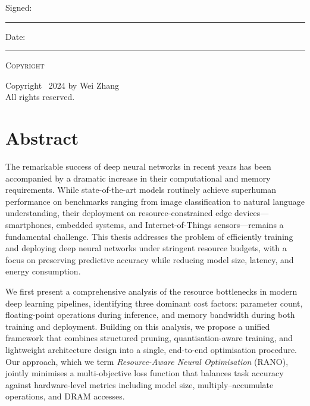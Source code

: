 \documentclass[12pt,a4paper,oneside]{book}
\newcommand{\tsinghuaauthor}{Wei Zhang}
\begin{document}
\vspace{15mm}

\noindent Signed:\hspace{5mm}\rule{0.35\textwidth}{0.4pt}

\vspace{5mm}

\noindent Date:\hspace{5mm}\rule{0.35\textwidth}{0.4pt}

\vspace{30mm}

\begin{center}
{\large\scshape\color{tsinghuapurple}Copyright}

\vspace{10mm}

Copyright \textcopyright\ 2024 by \tsinghuaauthor\\
All rights reserved.
\end{center}

\newpage

\chapter*{Abstract}

The remarkable success of deep neural networks in recent years has been
accompanied by a dramatic increase in their computational and memory
requirements. While state-of-the-art models routinely achieve superhuman
performance on benchmarks ranging from image classification to natural
language understanding, their deployment on resource-constrained edge
devices---smartphones, embedded systems, and Internet-of-Things
sensors---remains a fundamental challenge. This thesis addresses the
problem of efficiently training and deploying deep neural networks under
stringent resource budgets, with a focus on preserving predictive accuracy
while reducing model size, latency, and energy consumption.

We first present a comprehensive analysis of the resource bottlenecks in
modern deep learning pipelines, identifying three dominant cost factors:
parameter count, floating-point operations during inference, and memory
bandwidth during both training and deployment. Building on this analysis,
we propose a unified framework that combines structured pruning,
quantisation-aware training, and lightweight architecture design into a
single, end-to-end optimisation procedure. Our approach, which we term
\textit{Resource-Aware Neural Optimisation} (RANO), jointly minimises a
multi-objective loss function that balances task accuracy against
hardware-level metrics including model size, multiply--accumulate
operations, and DRAM accesses.
\end{document}
